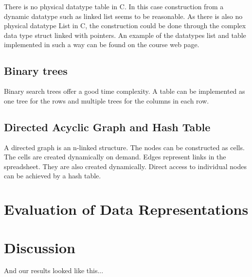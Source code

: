 \documentclass[a4paper,11pt,twoside]{article}
\begin{document}
There is no physical datatype table in C. In this case construction
from a dynamic datatype such as linked list seems to be reasonable. As
there is also no physical datatype List in C, the construction could
be done through the complex data type struct linked with pointers. An
example of the datatypes list and table implemented in such a way can
be found on the course web page. 
 

\subsection{Binary trees}
Binary search trees offer a good time complexity. A table can be
implemented as one tree for the rows and multiple trees for the
columns in each row. 

\subsection{Directed Acyclic Graph and Hash Table}
A directed graph is an n-linked structure. The nodes can be
constructed as cells. The cells are created dynamically on demand. 
Edges represent links in the spreadsheet. They are also created 
dynamically. Direct access to individual nodes can be achieved by a hash
table. 

 

\section{Evaluation of Data Representations}


\section{Discussion}
And our results looked like this...



\end{document}
